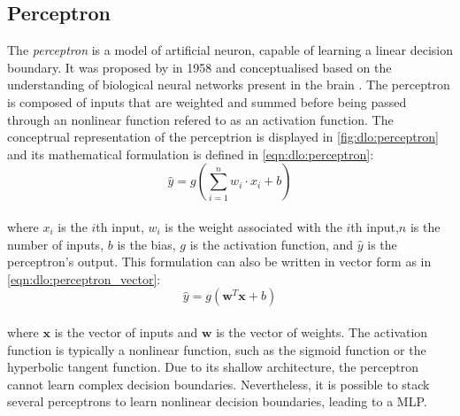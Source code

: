 \subsection{Perceptron}\label{sec:dlo:perceptron}

The \emph{perceptron} is a model of artificial neuron, capable of learning a
linear decision boundary. It was proposed by
\citeauthor{rosenblatt1958perceptron} in 1958 \cite{rosenblatt1958perceptron}
and conceptualised based on the understanding of biological neural networks
present in the brain \cite{mcculloch1943logical,hebb2005organization}. The
perceptron is composed of inputs that are weighted and summed before being
passed through an nonlinear function refered to as an activation function. The
conceptrual representation of the perceptrion is displayed in
\cref{fig:dlo:perceptron} and its mathematical formulation is defined in
\cref{eqn:dlo:perceptron}: \\

\begin{equation}
  \label{eqn:dlo:perceptron}
\hat{y} = g(\sum_{i=1}^{n} w_i \cdot x_i + b)
\end{equation} \\



\noindent where $x_i$ is the $i$th input, $w_i$ is the weight associated with
the $i$th input,$n$ is the number of inputs, $b$ is the bias, $g$ is the
activation function, and $\hat{y}$ is the perceptron's output. This formulation
can also be written in vector form as in \cref{eqn:dlo:perceptron_vector}: \\

\begin{equation}
  \label{eqn:dlo:perceptron_vector}
  \hat{y} = g(\mathbf{w}^T \mathbf{x} + b)
\end{equation}\\

\noindent where $\mathbf{x}$ is the vector of inputs and $\mathbf{w}$ is the
vector of weights. The activation function is typically a nonlinear function,
such as the sigmoid function or the hyperbolic tangent function. Due to its
shallow architecture, the perceptron cannot learn complex decision boundaries.
Nevertheless, it is possible to stack several perceptrons to learn nonlinear
decision boundaries, leading to a \acl{MLP}.\\

